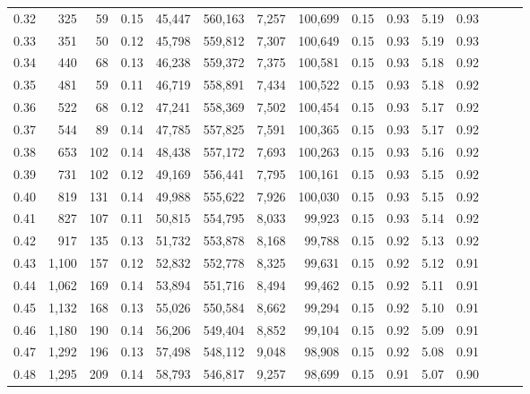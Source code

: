 \begin{tabular}{rrrrrrrrrrrrrrr}
0.32 &     325 &      59 &  0.15 &   45,447 &  560,163 &    7,257 &  100,699 &  0.15 &  0.93 &  5.19 &      0.93 \\
0.33 &     351 &      50 &  0.12 &   45,798 &  559,812 &    7,307 &  100,649 &  0.15 &  0.93 &  5.19 &      0.93 \\
0.34 &     440 &      68 &  0.13 &   46,238 &  559,372 &    7,375 &  100,581 &  0.15 &  0.93 &  5.18 &      0.92 \\
0.35 &     481 &      59 &  0.11 &   46,719 &  558,891 &    7,434 &  100,522 &  0.15 &  0.93 &  5.18 &      0.92 \\
0.36 &     522 &      68 &  0.12 &   47,241 &  558,369 &    7,502 &  100,454 &  0.15 &  0.93 &  5.17 &      0.92 \\
0.37 &     544 &      89 &  0.14 &   47,785 &  557,825 &    7,591 &  100,365 &  0.15 &  0.93 &  5.17 &      0.92 \\
0.38 &     653 &     102 &  0.14 &   48,438 &  557,172 &    7,693 &  100,263 &  0.15 &  0.93 &  5.16 &      0.92 \\
0.39 &     731 &     102 &  0.12 &   49,169 &  556,441 &    7,795 &  100,161 &  0.15 &  0.93 &  5.15 &      0.92 \\
0.40 &     819 &     131 &  0.14 &   49,988 &  555,622 &    7,926 &  100,030 &  0.15 &  0.93 &  5.15 &      0.92 \\
0.41 &     827 &     107 &  0.11 &   50,815 &  554,795 &    8,033 &   99,923 &  0.15 &  0.93 &  5.14 &      0.92 \\
0.42 &     917 &     135 &  0.13 &   51,732 &  553,878 &    8,168 &   99,788 &  0.15 &  0.92 &  5.13 &      0.92 \\
0.43 &   1,100 &     157 &  0.12 &   52,832 &  552,778 &    8,325 &   99,631 &  0.15 &  0.92 &  5.12 &      0.91 \\
0.44 &   1,062 &     169 &  0.14 &   53,894 &  551,716 &    8,494 &   99,462 &  0.15 &  0.92 &  5.11 &      0.91 \\
0.45 &   1,132 &     168 &  0.13 &   55,026 &  550,584 &    8,662 &   99,294 &  0.15 &  0.92 &  5.10 &      0.91 \\
0.46 &   1,180 &     190 &  0.14 &   56,206 &  549,404 &    8,852 &   99,104 &  0.15 &  0.92 &  5.09 &      0.91 \\
0.47 &   1,292 &     196 &  0.13 &   57,498 &  548,112 &    9,048 &   98,908 &  0.15 &  0.92 &  5.08 &      0.91 \\
0.48 &   1,295 &     209 &  0.14 &   58,793 &  546,817 &    9,257 &   98,699 &  0.15 &  0.91 &  5.07 &      0.90 \\

\end{tabular}
